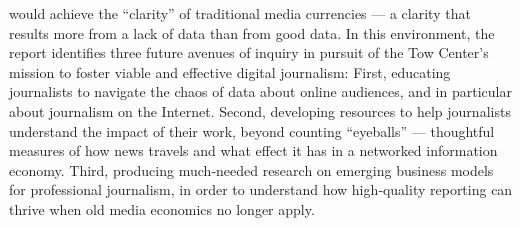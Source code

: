 would achieve the ``clarity'' of traditional media currencies — a clarity
that results more from a lack of data than from good data.
In this environment, the report identifies three future avenues of inquiry
in pursuit of the Tow Center’s mission to foster viable and effective digital
journalism:
First, educating journalists to navigate the chaos of data about online audiences,
and in particular about journalism on the Internet.
Second, developing resources to help journalists understand the impact of their
work, beyond counting ``eyeballs'' — thoughtful measures of how news travels
and what effect it has in a networked information economy.
Third, producing much‐needed research on emerging business models for
professional journalism, in order to understand how high‐quality reporting can
thrive when old media economics no longer apply.

